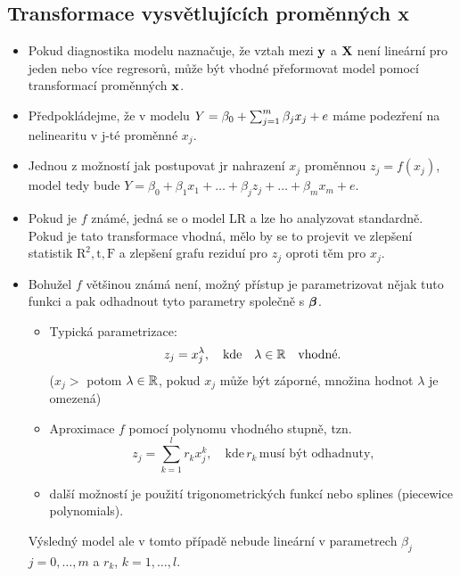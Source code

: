 \subsection{Transformace vysvětlujících proměnných x}

\begin{itemize}
\item Pokud diagnostika modelu naznačuje, že vztah mezi $ \textbf{y} $ a $ \textbf{X} $ není lineární pro jeden nebo více regresorů, může být vhodné přeformovat model pomocí transformací proměnných $ \textbf{x} $.

\item Předpokládejme, že v modelu $ Y = \beta_0 + \sum_{j=1}^{m} \beta_j x_j + e $ máme podezření na nelinearitu v j-té proměnné $ x_j $.

\item Jednou z možností jak postupovat jr nahrazení $ x_j $ proměnnou $ z_j = f(x_j) $, model tedy bude $ Y = \beta_0 + \beta_1 x_1 + \dots + \beta_j z_j + \dots + \beta_m x_m + e $.

\item Pokud je $ f $ známé, jedná se o model LR a lze ho analyzovat standardně. Pokud je tato transformace vhodná, mělo by se to projevit ve zlepšení statistik $ \text{R}^2, \text{t}, \text{F} $ a zlepšení grafu reziduí pro $ z_j $ oproti těm pro $ x_j $.

\item Bohužel $ f $ většinou známá není, možný přístup je parametrizovat nějak tuto funkci a pak odhadnout tyto parametry společně s $ \boldsymbol{\beta} $.

\begin{itemize}

\item Typická parametrizace: 
$$
  z_j = x_j^{\lambda}, \quad \text{kde} \quad \lambda \in \mathbb{R} \quad \text{vhodné}.
$$
($ x_j > $ potom $ \lambda \in \mathbb{R} $, pokud $ x_j $ může být záporné, množina hodnot $ \lambda $ je omezená)
\item Aproximace $ f $ pomocí polynomu vhodného stupně, tzn. 
$$
  z_j = \sum_{k=1}^{l} r_k x_j^{k} , \quad \text{kde} \, r_k \, \text{musí být odhadnuty,}
$$
\item další možností je použití trigonometrických funkcí nebo splines (piecewice polynomials).

\end{itemize}

Výsledný model ale v tomto případě nebude lineární v parametrech $ \beta_j $ $ j = 0,\dots,m $ a $ r_k $, $ k = 1,\dots,l $.
\end{itemize}